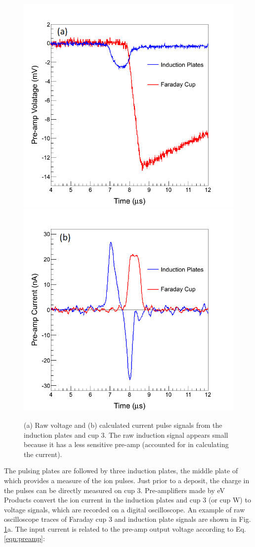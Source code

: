 \begin{figure} %
                \includegraphics[width=.49\textwidth]{figures/pulse_ind_cup3_raw.png}
                \includegraphics[width=.49\textwidth]{figures/pulse_ind_cup3_shaped.png}
                \caption{(a) Raw voltage and (b) calculated current pulse signals from the induction plates and cup 3.  The raw induction signal appears small because it has a less sensitive pre-amp (accounted for in calculating the current).}
        \label{fig:pulse_raw_shaped}
\end{figure}

The pulsing plates are followed by three induction plates, the middle plate of which provides a measure of the ion pulses.  Just prior to a deposit, the charge in the pulses can be directly measured on cup 3.  Pre-amplifiers made by eV Products convert the ion current in the induction plates and cup 3 (or cup W) to voltage signals, which are recorded on a digital oscilloscope.  An example of raw oscilloscope traces of Faraday cup 3 and induction plate signals are shown in Fig. \ref{fig:pulse_raw_shaped}a.  The input current is related to the pre-amp output voltage according to Eq. \ref{eqn:preamp}:

